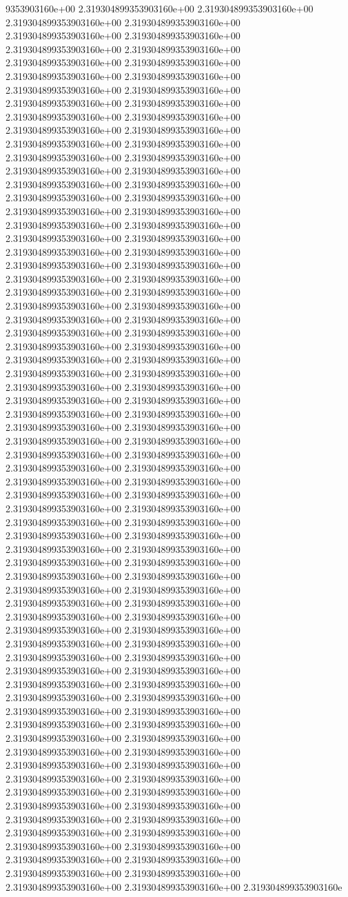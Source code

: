 9353903160e+00	2.319304899353903160e+00	2.319304899353903160e+00	2.319304899353903160e+00	2.319304899353903160e+00	2.319304899353903160e+00	2.319304899353903160e+00	2.319304899353903160e+00	2.319304899353903160e+00	2.319304899353903160e+00	2.319304899353903160e+00	2.319304899353903160e+00	2.319304899353903160e+00	2.319304899353903160e+00	2.319304899353903160e+00	2.319304899353903160e+00	2.319304899353903160e+00	2.319304899353903160e+00	2.319304899353903160e+00	2.319304899353903160e+00	2.319304899353903160e+00	2.319304899353903160e+00	2.319304899353903160e+00	2.319304899353903160e+00	2.319304899353903160e+00	2.319304899353903160e+00	2.319304899353903160e+00	2.319304899353903160e+00	2.319304899353903160e+00	2.319304899353903160e+00	2.319304899353903160e+00	2.319304899353903160e+00	2.319304899353903160e+00	2.319304899353903160e+00	2.319304899353903160e+00	2.319304899353903160e+00	2.319304899353903160e+00	2.319304899353903160e+00	2.319304899353903160e+00	2.319304899353903160e+00	2.319304899353903160e+00	2.319304899353903160e+00	2.319304899353903160e+00	2.319304899353903160e+00	2.319304899353903160e+00	2.319304899353903160e+00	2.319304899353903160e+00	2.319304899353903160e+00	2.319304899353903160e+00	2.319304899353903160e+00	2.319304899353903160e+00	2.319304899353903160e+00	2.319304899353903160e+00	2.319304899353903160e+00	2.319304899353903160e+00	2.319304899353903160e+00	2.319304899353903160e+00	2.319304899353903160e+00	2.319304899353903160e+00	2.319304899353903160e+00	2.319304899353903160e+00	2.319304899353903160e+00	2.319304899353903160e+00	2.319304899353903160e+00	2.319304899353903160e+00	2.319304899353903160e+00	2.319304899353903160e+00	2.319304899353903160e+00	2.319304899353903160e+00	2.319304899353903160e+00	2.319304899353903160e+00	2.319304899353903160e+00	2.319304899353903160e+00	2.319304899353903160e+00	2.319304899353903160e+00	2.319304899353903160e+00	2.319304899353903160e+00	2.319304899353903160e+00	2.319304899353903160e+00	2.319304899353903160e+00	2.319304899353903160e+00	2.319304899353903160e+00	2.319304899353903160e+00	2.319304899353903160e+00	2.319304899353903160e+00	2.319304899353903160e+00	2.319304899353903160e+00	2.319304899353903160e+00	2.319304899353903160e+00	2.319304899353903160e+00	2.319304899353903160e+00	2.319304899353903160e+00	2.319304899353903160e+00	2.319304899353903160e+00	2.319304899353903160e+00	2.319304899353903160e+00	2.319304899353903160e+00	2.319304899353903160e+00	2.319304899353903160e+00	2.319304899353903160e+00	2.319304899353903160e+00	2.319304899353903160e+00	2.319304899353903160e+00	2.319304899353903160e+00	2.319304899353903160e+00	2.319304899353903160e+00	2.319304899353903160e+00	2.319304899353903160e+00	2.319304899353903160e+00	2.319304899353903160e+00	2.319304899353903160e+00	2.319304899353903160e+00	2.319304899353903160e+00	2.319304899353903160e+00	2.319304899353903160e+00	2.319304899353903160e+00	2.319304899353903160e+00	2.319304899353903160e+00	2.319304899353903160e+00	2.319304899353903160e+00	2.319304899353903160e+00	2.319304899353903160e+00	2.319304899353903160e+00	2.319304899353903160e+00	2.319304899353903160e+00	2.319304899353903160e+00	2.319304899353903160e+00	2.319304899353903160e+00	2.319304899353903160e+00	2.319304899353903160e+00	2.319304899353903160e+00	2.319304899353903160e+00	2.319304899353903160e+00	2.319304899353903160e